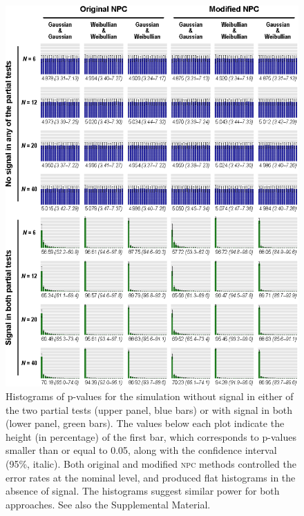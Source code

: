 \begin{figure}[p]
\begin{center}
\centerline{\includegraphics{images/validity_hist.eps}}
\end{center}
\vspace{-3mm}
\caption[Histograms of p-values for the simulations.]{Histograms of p-values for the simulation without signal in either of the two partial tests (upper panel, blue bars) or with signal in both (lower panel, green bars). The values below each plot indicate the height (in percentage) of the first bar, which corresponds to p-values smaller than or equal to 0.05, along with the confidence interval (95\%, italic). Both original and modified \textsc{npc} methods controlled the error rates at the nominal level, and produced flat histograms in the absence of signal. The histograms suggest similar power for both approaches. See also the Supplemental Material.}
\label{fig:comb:validity_hist}
\end{figure}

